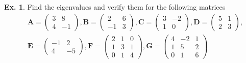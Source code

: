 \documentclass[11pt,a4paper]{book}
\theoremstyle{definition}\newtheorem{definition}{Definition}
\theoremstyle{definition}\newtheorem{fact}{Fact}
\theoremstyle{definition}\newtheorem{remark}{Remark}
\theoremstyle{definition}\newtheorem{ex}{Ex.}
\theoremstyle{definition}\newtheorem{project}{Project}
\theoremstyle{definition}\newtheorem{problem}{Problem}
\theoremstyle{definition}\newtheorem{example}{Example}
\numberwithin{theorem}{section}
\numberwithin{corollary}{chapter}
\numberwithin{assumption}{chapter}
\numberwithin{definition}{chapter}
\numberwithin{prop}{chapter}
\numberwithin{notation}{chapter}
\numberwithin{problem}{chapter}
\numberwithin{example}{chapter}
\numberwithin{fact}{chapter}
\numberwithin{ex}{chapter}
\def\E{\mathbb E}
\def\A{\mathbf A}
\def\B{\mathbf B}
\def\C{\mathbf C}
\def\D{\mathbf D}
\def\E{\mathbf E}
\def\F{\mathbf F}
\def\G{\mathbf G}
\begin{document}
	
	\begin{ex}
		Find the eigenvalues and verify them for the following matrices
		\begin{align*}
			& \A = \begin{pmatrix}
				3 & 8 \\ 4 & - 1
			\end{pmatrix},  
			 \B = \begin{pmatrix}
				2 & 6 \\ - 1 & 3
			\end{pmatrix}, 
			 \C =\begin{pmatrix}
				3 & -2 \\
				1 &  0  
			\end{pmatrix}, 
			 \D = \begin{pmatrix}
				5 & 1 \\
				2 & 3  
			\end{pmatrix}, \\
			&  \E = \begin{pmatrix}
				-1 & 2 \\
				4  & -5  
			\end{pmatrix}, 
			\F = \begin{pmatrix}
				2 & 1 & 0 \\
				1 & 3 & 1 \\
				0 & 1 & 4
			\end{pmatrix}, 
			 \G = \begin{pmatrix}
				4 & -2 & 1 \\
				1 &  5 & 2 \\
				0 &  1 & 6
			\end{pmatrix}
		\end{align*}
	\end{ex}
	
	
\end{document}
